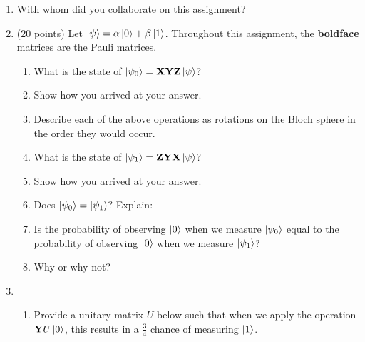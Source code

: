\documentclass[12pt]{article}
\begin{document}
\begin{enumerate}[font=\bfseries]
\item With whom did you collaborate on this assignment?
    \item (20 points) Let $\ket{\psi} = \alpha\ket{0} + \beta\ket{1}$. Throughout this assignment, the {\bf boldface} matrices are the Pauli matrices.
    \begin{enumerate}[label=\theenumi.\arabic*]
        \item {} What is the state of $\ket{\psi_0} = \mathbf{X}\mathbf{Y}\mathbf{Z}\ket{\psi}$? 
        \item {} Show how you arrived at your answer. 
        \item {} Describe each of the above operations as rotations on the Bloch sphere in the order they would occur.
        \item {} What is the state of $\ket{\psi_1} = \mathbf{Z}\mathbf{Y}\mathbf{X}\ket{\psi}$? 
        \item {} Show how you arrived at your answer. 
        \item {} Does $\ket{\psi_0} = \ket{\psi_1}$?   Explain:
        \item {} Is the probability of observing $\ket{0}$ when we measure $\ket{\psi_0}$ equal to the probability of observing $\ket{0}$ when we measure $\ket{\psi_1}$?
        \item {} Why or why not? 
    \end{enumerate}
    \item {}
    \begin{enumerate}[label=\theenumi.\arabic*]
    \item {} Provide a unitary matrix $U$ below such that when we apply the operation $\mathbf{Y}U\ket{0}$, this results in a $\frac{3}{4}$ chance of measuring $\ket{1}$. 
\end{enumerate}
\end{enumerate}
\end{document}
